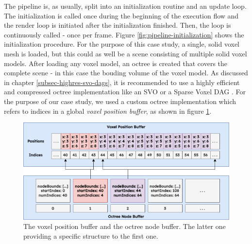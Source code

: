The pipeline is, as usually, split into an initialization routine and an update loop. The initialization is 
called once during the beginning of the execution flow and the render loop is initiated after the initialization 
finished. Then, the loop is continuously called - once per frame. Figure \ref{fig:pipeline-initialization} shows 
the initialization procedure. For the purpose of this case study, a single, solid voxel mesh is loaded, but this 
could as well be a scene consisting of multiple solid voxel models. After loading any voxel model, an octree is 
created that covers the complete scene - in this case the bouding volume of the voxel model. As discussed in 
chapter \ref{subsec-highres-svo-dags}, it is recommended to use a highly efficient and compressed octree 
implementation like an \ac{SVO} or a Sparse Voxel \ac{DAG} \cite{Kampe2013}. For the purpose of our case study, 
we used a custom octree implementation which refers to indices in a global \emph{voxel position buffer}, as 
shown in figure \ref{fig:voxelpos-octreenode-buffer}.\\

\begin{figure}[h]
    \centering
    \includegraphics[width=\linewidth]{images/graphics/voxelpos-octreenode-buffer.png}
    \caption{The voxel position buffer and the octree node buffer. The latter one providing a 
    specific structure to the first one.}
    \label{fig:voxelpos-octreenode-buffer}
\end{figure}

